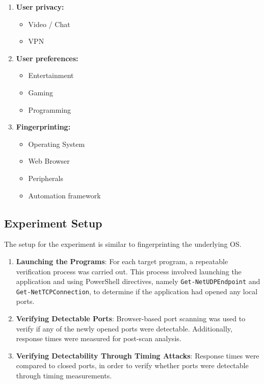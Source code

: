 \begin{enumerate}
    \item \textbf{User privacy:}
    \begin{itemize}
        \item Video / Chat
        \item VPN
    \end{itemize}
    \item \textbf{User preferences:}
    \begin{itemize}
        \item Entertainment
        \item Gaming
        \item Programming
    \end{itemize}
    \item \textbf{Fingerprinting:}
    \begin{itemize}
        \item Operating System
        \item Web Browser
        \item Peripherals
        \item Automation framework
    \end{itemize}
\end{enumerate}

\subsection{Experiment Setup}

The setup for the experiment is similar to fingerprinting the underlying OS.

\begin{enumerate}
    \item \textbf{Launching the Programs}: For each target program, a repeatable verification process was carried out. This process involved launching the application and using PowerShell directives, namely \texttt{Get-NetUDPEndpoint} and \texttt{Get-NetTCPConnection}, to determine if the application had opened any local ports.
    
    \item \textbf{Verifying Detectable Ports}: Browser-based port scanning was used to verify if any of the newly opened ports were detectable. Additionally, response times were measured for post-scan analysis.   

    \item \textbf{Verifying Detectability Through Timing Attacks}: Response times were compared to closed ports, in order to verify whether ports were detectable through timing measurements.
\end{enumerate}


